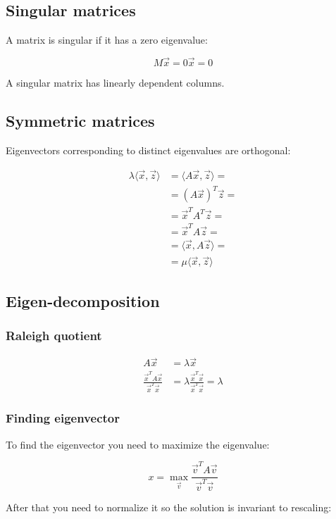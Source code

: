 	\subsection{Singular matrices}
	A matrix is singular if it has a zero eigenvalue:

	$$M\vec{x} = 0\vec{x} = 0$$

	A singular matrix has linearly dependent columns.

	\subsection{Symmetric matrices}
	Eigenvectors corresponding to distinct eigenvalues are orthogonal:

	\begin{align*}
		\lambda\langle \vec{x}, \vec{z}\rangle &= \langle A\vec{x}, \vec{z}\rangle=\\
					   &=(A\vec{x})^T\vec{z}=\\
					   &=\vec{x}^TA^T\vec{z}=\\
					   &=\vec{x}^TA\vec{z}=\\
					   &=\langle \vec{x}, A\vec{z}\rangle=\\
					   &=\mu\langle \vec{x}, \vec{z}\rangle
	\end{align*}

	\subsection{Eigen-decomposition}

		\subsubsection{Raleigh quotient}

		\begin{align*}
			A\vec{x} &=\lambda \vec{x}\\
			\frac{\vec{x}^TA\vec{x}}{\vec{x}^T\vec{x}} &=\lambda\frac{\vec{x}^T\vec{x}}{\vec{x}^T\vec{x}} = \lambda
		\end{align*}

		\subsubsection{Finding eigenvector}
		To find the eigenvector you need to maximize the eigenvalue:

		$$x = \max\limits_{\vec{v}}\frac{\vec{v}^TA\vec{v}}{\vec{v}^T\vec{v}}$$

		After that you need to normalize it so the solution is invariant to rescaling:

